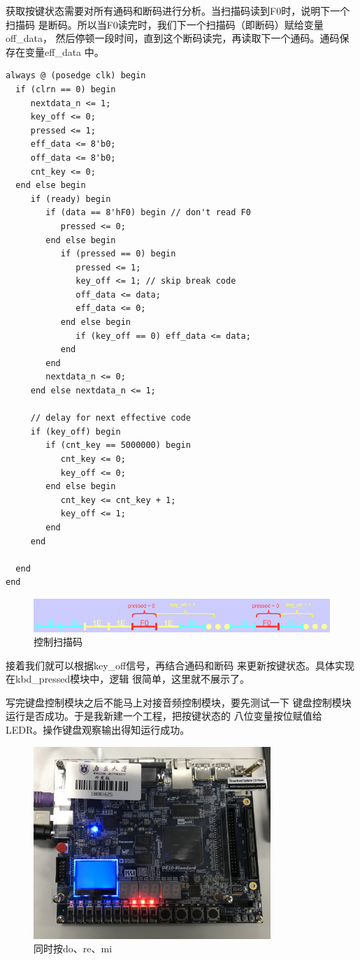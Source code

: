 \documentclass[12pt,a4paper,UTF8]{article}
\begin{document}
获取按键状态需要对所有通码和断码进行分析。当扫描码读到F0时，说明下一个扫描码
是断码。所以当F0读完时，我们下一个扫描码（即断码）赋给变量\mbox{off\_data}，
然后停顿一段时间，直到这个断码读完，再读取下一个通码。通码保存在变量\mbox{eff\_data}
中。
\begin{lstlisting}[style=verilog-style]
always @ (posedge clk) begin
  if (clrn == 0) begin
     nextdata_n <= 1;
     key_off <= 0;
     pressed <= 1;
     eff_data <= 8'b0;
     off_data <= 8'b0;
     cnt_key <= 0;
  end else begin
     if (ready) begin 
        if (data == 8'hF0) begin // don't read F0
           pressed <= 0;
        end else begin
           if (pressed == 0) begin
              pressed <= 1;
              key_off <= 1; // skip break code
              off_data <= data;
              eff_data <= 0;
           end else begin
              if (key_off == 0) eff_data <= data;
           end
        end
        nextdata_n <= 0; 
     end else nextdata_n <= 1;
  
     // delay for next effective code
     if (key_off) begin
        if (cnt_key == 5000000) begin
           cnt_key <= 0;
           key_off <= 0;
        end else begin
           cnt_key <= cnt_key + 1;
           key_off <= 1;
        end
     end 
     
  end
end
\end{lstlisting}

\begin{figure}[H]
  \centering
  \includegraphics[width=1\textwidth]{scan_code.PNG}
  \caption{控制扫描码}
  \label{scan}
\end{figure}

接着我们就可以根据\mbox{key\_off}信号，再结合通码和断码
来更新按键状态。具体实现在\mbox{kbd\_pressed}模块中，逻辑
很简单，这里就不展示了。

写完键盘控制模块之后不能马上对接音频控制模块，要先测试一下
键盘控制模块运行是否成功。于是我新建一个工程，把按键状态的
八位变量按位赋值给LEDR。操作键盘观察输出得知运行成功。

\begin{figure}[H]
  \centering
  \includegraphics[width=0.8\textwidth]{test_kbd.jpg}
  \caption{同时按do、re、mi}
  \label{kbd}
\end{figure}
\end{document}
